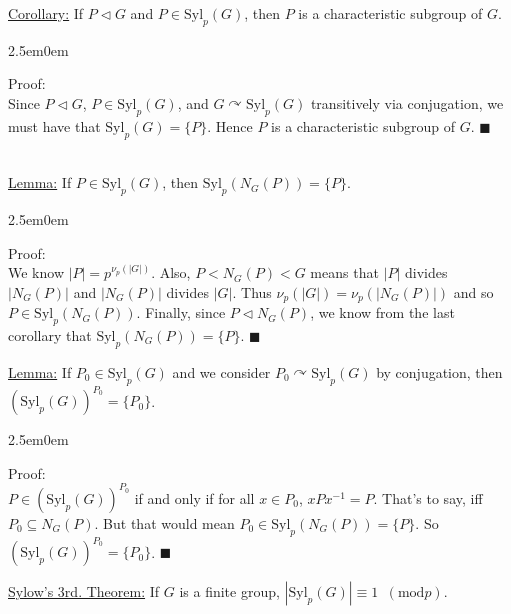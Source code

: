 \documentclass{book}
\newcommand{\hTwo}{%
\color{Black}%
   \fontsize{13}{15}\selectfont%
}
\newcommand{\exTwo}{%
   \color{Purple}%
   \fontsize{13}{15}\selectfont%
}
\newcommand{\exThreeP}{%
   \color{RedViolet}%
   \fontsize{12}{14}\selectfont%
}
\newenvironment{myIndent}{%
   \begin{adjustwidth}{2.5em}{0em}%
}{%
   \end{adjustwidth}%
}
\newcommand{\mMod}[1]{\phantom{a}(\mathrel{\mathrm{mod}} #1)}
\newcommand{\Syl}{\mathrm{Syl}}
\newcommand{\mySepTwo}[1][.]{%
   {\noindent\color{#1}{\rule{6.5in}{0.5mm}}}\\%
}
\newcommand{\retTwo}{\hfill\bigbreak}
\begin{document}
\exTwo\ul{Corollary:} If $P \lhd G$ and $P \in \Syl_p(G)$, then $P$ is a characteristic subgroup of $G$.

\begin{myIndent}\exThreeP
	Proof:\\
	Since $P \lhd G$, $P \in \Syl_p(G)$, and $G \curvearrowright \Syl_p(G)$ transitively via conjugation, we must have that $\Syl_p(G) = \{P\}$. Hence $P$ is a characteristic subgroup of $G$. $\blacksquare$\retTwo
\end{myIndent}

\hTwo\mySepTwo

\exTwo\ul{Lemma:} If $P \in \Syl_p(G)$, then $\Syl_p(N_G(P)) = \{P\}$.

\begin{myIndent}\exThreeP
	Proof:\\
	We know $|P| = p^{\nu_p(|G|)}$. Also, $P < N_G(P) < G$ means that $|P|$ divides $|N_G(P)|$ and $|N_G(P)|$ divides $|G|$. Thus $\nu_p(|G|) = \nu_p(|N_G(P)|)$ and so $P \in \Syl_p(N_G(P))$. Finally, since $P \lhd N_G(P)$, we know from the last corollary that $\Syl_p(N_G(P)) = \{P\}$. $\blacksquare$\retTwo
\end{myIndent}

\ul{Lemma:} If $P_0 \in \Syl_p(G)$ and we consider $P_0 \curvearrowright \Syl_p(G)$ by conjugation, then\\ $(\Syl_p(G))^{P_0} = \{P_0\}$.

\begin{myIndent}\exThreeP
	Proof:\\
	$P \in (\Syl_p(G))^{P_0}$ if and only if for all $x\in P_0$, $xPx^{-1} = P$. That's to say, iff $P_0 \subseteq N_G(P)$. But that would mean $P_0 \in \Syl_p(N_G(P)) = \{P\}$. So $(\Syl_p(G))^{P_0} = \{P_0\}$. $\blacksquare$\newpage
\end{myIndent}

\ul{Sylow's 3rd. Theorem:} If $G$ is a finite group, $|\Syl_p(G)| \equiv 1 \mMod{p}$.
\end{document}
